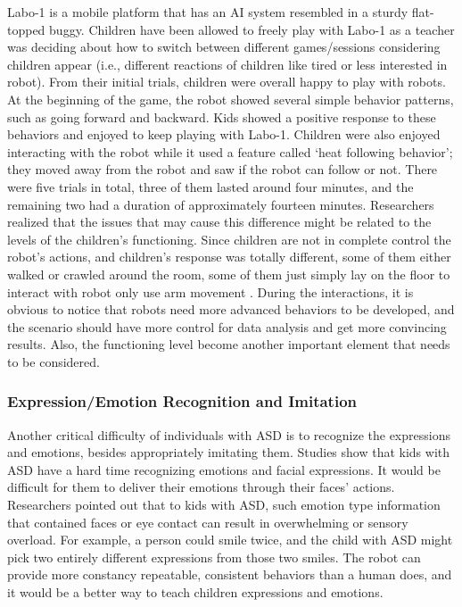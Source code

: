 Labo-1 is a mobile platform that has an AI system resembled in a sturdy flat-topped buggy. 
Children have been allowed to freely play with Labo-1 as a teacher was deciding about how 
to switch between different games/sessions considering children appear (i.e., different reactions 
of children like tired or less interested in robot). From their initial trials, children were 
overall happy to play with robots. At the beginning of the game, the robot showed several simple 
behavior patterns, such as going forward and backward. Kids showed a positive response to these 
behaviors and enjoyed to keep playing with Labo-1. Children were also enjoyed interacting with the 
robot while it used a feature called ‘heat following behavior’; they moved away from the robot and 
saw if the robot can follow or not. There were five trials in total, three of them lasted around four 
minutes, and the remaining two had a duration of approximately fourteen minutes. Researchers realized 
that the issues that may cause this difference might be related to the levels of the children’s functioning. 
Since children are not in complete control the robot’s actions, and children’s response was totally 
different, some of them either walked or crawled around the room, some of them just simply lay on 
the floor to interact with robot only use arm movement \cite{dautenhahn2004towards}. During the interactions, it is obvious 
to notice that robots need more advanced behaviors to be developed, and the scenario should have more 
control for data analysis and get more convincing results. Also, the functioning level become another 
important element that needs to be considered.\\

\subsubsection{Expression/Emotion Recognition and Imitation}
Another critical difficulty of individuals with ASD is to recognize the expressions and emotions, 
besides appropriately imitating them. Studies show that kids with ASD have a hard time recognizing 
emotions and facial expressions. It would be difficult for them to deliver their emotions through 
their faces' actions. Researchers pointed out that to kids with ASD, such emotion type information 
that contained faces or eye contact can result in overwhelming or sensory overload. For example, a 
person could smile twice, and the child with ASD might pick two entirely different expressions from 
those two smiles. The robot can provide more constancy repeatable, consistent behaviors than a human does, 
and it would be a better way to teach children expressions and emotions.\\

